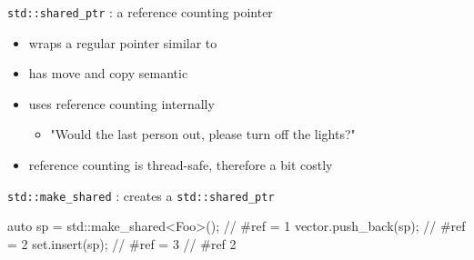 \begin{frame}[fragile]
  \begin{block}{\texttt{std::shared_ptr} : a reference counting pointer}
    \begin{itemize}
    \item wraps a regular pointer similar to 
    \item has move and copy semantic
    \item uses reference counting internally
      \begin{itemize}
      \item "Would the last person out, please turn off the lights?"
      \end{itemize}
    \item reference counting is thread-safe, therefore a bit costly
    \end{itemize}
  \end{block}
  \begin{block}{\texttt{std::make\_shared} : creates a \texttt{std::shared\_ptr}}
    \begin{cppcode*}{}
      {
        auto sp = std::make_shared<Foo>(); // #ref = 1
        vector.push_back(sp);              // #ref = 2
        set.insert(sp);                    // #ref = 3
      } // #ref 2
    \end{cppcode*}
  \end{block}
\end{frame}

